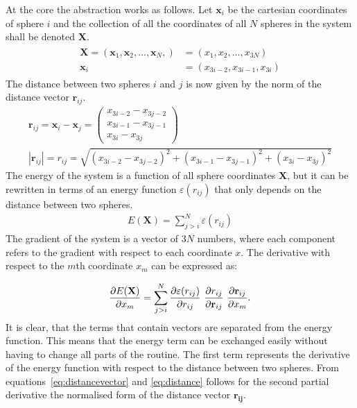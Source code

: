 At the core the abstraction works as follows. Let $\mathbf{x}_i$ be the
cartesian coordinates of sphere $i$ and the collection of all the coordinates
of all $N$ spheres in the system shall be denoted $\mathbf{X}$.
%
\begin{align}
    \begin{aligned}
        \mathbf{X}=(\mathbf{x}_1,\mathbf{x}_2,\ldots,\mathbf{x}_N,)&=(x_1,x_2,\ldots,x_{3N}) \\
            \mathbf{x}_i &= (x_{3i-2},x_{3i-1},x_{3i})
    \end{aligned}
\end{align}%
%
The distance between two spheres $i$ and $j$ is now given by the norm of the
distance vector $\mathbf{r}_{ij}$. %
%
\begin{align}
    \mathbf{r}_{ij}=\mathbf{x}_i-\mathbf{x}_j=
    \begin{pmatrix}
        x_{3i-2} - x_{3j-2}\\
        x_{3i-1} - x_{3j-1}\\
        x_{3i} - x_{3j}
    \end{pmatrix}\label{eq:distancevector}\\
    |\mathbf{r}_{ij}|=r_{ij}=\sqrt{(x_{3i-2} - x_{3j-2})^2 + (x_{3i-1} - x_{3j-1})^2 + (x_{3i} - x_{3j})^2}\label{eq:distance}
\end{align}
%
The energy of the system is a function of all sphere coordinates $\mathbf{X}$,
but it can be rewritten in terms of an energy function $\varepsilon(r_{ij})$ that only depends on the
distance between two spheres. %
%
\begin{align}
    E(\mathbf{X})=\sum_{j>i}^N\varepsilon(r_{ij})
\end{align}%
%
The gradient of the system is a vector of $3N$ numbers, where each component
refers to the gradient with respect to each coordinate $x$. The derivative with
respect to the $m$th coordinate $x_m$ can be expressed as:

\begin{align}
    \pdv{E(\mathbf{X})}{x_m}=\sum_{j>i}^N\pdv{\varepsilon(r_{ij})}{r_{ij}}\ \pdv{r_{ij}}{\mathbf{r}_{ij}}\ \pdv{\mathbf{r}_{ij}}{x_m}.\label{eq:gradientcomponent}
\end{align}%
%
It is clear, that the terms that contain vectors are separated from the energy
function. This means that the energy term can be exchanged easily without
having to change all parts of the routine. The first term represents the
derivative of the energy function with respect to the distance between two
spheres. From equations~\eqref{eq:distancevector} and \eqref{eq:distance}
follows for the second partial derivative the normalised form of the distance
vector $\mathbf{r_{ij}}$.

